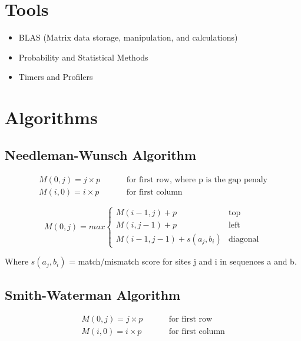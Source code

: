 \documentclass{article}
\begin{document}
\section*{Tools}
\begin{itemize}
    \item BLAS (Matrix data storage, manipulation, and calculations)
    \item Probability and Statistical Methods
    \item Timers and Profilers
\end{itemize}


\section*{Algorithms}
\subsection*{Needleman-Wunsch Algorithm}
\begin{align*}
    M(0, j) = j \times p  \hspace{1cm}&\text{for first row, where p is the gap penaly} \\
    M(i, 0) = i \times p  \hspace{1cm}&\text{for first column}
\end{align*}

\begin{equation*}
    M(0, j) = max \begin{cases}
        M(i-1, j) + p & \text{top} \\
        M(i, j-1) + p & \text{left} \\
        M(i-1, j-1) + s(a_j , b_i) & \text{diagonal}
  \end{cases}
\end{equation*}

Where $s(a_j , b_i)$ = match/mismatch score for sites j and i in sequences a and b.

\subsection*{Smith-Waterman Algorithm}
\begin{align*}
    M(0, j) = j \times p  \hspace{1cm}&\text{for first row} \\
    M(i, 0) = i \times p  \hspace{1cm}&\text{for first column}
\end{align*}
\end{document}
